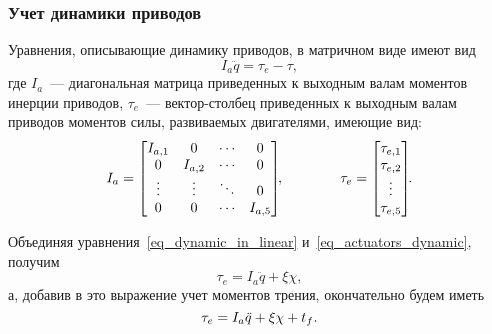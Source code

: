 \subsubsection{Учет динамики приводов}
Уравнения, описывающие динамику приводов, в матричном виде имеют вид
\begin{equation}\label{eq_actuators_dynamic}
    I_a \ddot{q} = \tau_e - \tau,
\end{equation}
где $I_a$~--- диагональная матрица приведенных к выходным валам моментов инерции приводов, $\tau_e$~--- вектор-столбец приведенных к выходным валам приводов моментов силы, развиваемых двигателями, имеющие вид:
\begin{equation}
    I_a =
    \begin{bmatrix}
        I_{a,1} & 0 & \cdots & 0 \\
        0 & I_{a,2} & \cdots & 0 \\
        \vdots & \vdots & \ddots & 0 \\
        0 & 0 & \cdots & I_{a,5}
    \end{bmatrix}\!\!,
    \qquad \qquad
    \tau_e =
    \begin{bmatrix}
        \tau_{e,1} \\ \tau_{e,2} \\ \vdots \\ \tau_{e,5}
    \end{bmatrix}\!\!\ldotp
\end{equation}

Объединяя уравнения~\eqref{eq_dynamic_in_linear} и~\eqref{eq_actuators_dynamic}, получим
\begin{equation}
    \tau_e = I_a \ddot{q} + \xi \chi,
\end{equation}
а, добавив в это выражение учет моментов трения, окончательно будем иметь
\begin{equation}\label{eq_eqs_with_tau_f}
    \tau_e = I_a \ddot{q} + \xi \chi + t_f \ldotp
\end{equation}


